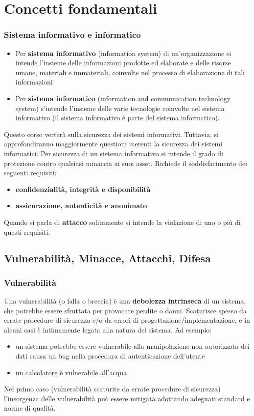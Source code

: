 \section{Concetti fondamentali}

\subsubsection{Sistema informativo e informatico}

\begin{itemize} 
  \item Per \textbf{sistema informativo} (information system) di un’organizzazione si intende l’insieme delle informazioni prodotte ed elaborate e delle risorse umane, materiali e immateriali, coinvolte nel processo di elaborazione di tali informazioni
  \item Per \textbf{sistema informatico} (information and communication technology system) s'intende l'insieme delle varie tecnologie coinvolte nel sistema informativo (il sistema informativo è parte del sistema informatico).
\end{itemize}
Questo corso verterà sulla sicurezza dei sistemi informativi. Tuttavia, si approfondiranno maggiormente questioni inerenti la sicurezza
dei sistemi informatici. Per sicurezza di un sistema informativo si intende il grado di protezione contro qualsiasi minaccia ai suoi asset.
Richiede il soddisfacimento dei seguenti requisiti:
\begin{itemize} 
  \item \textbf{confidenzialità, integrità e disponibilità}
  \item \textbf{assicurazione, autenticità e anonimato}
\end{itemize}
Quando si parla di \textbf{attacco} solitamente si intende la violazione di uno o più di questi requisiti.

\subsection{Vulnerabilità, Minacce, Attacchi, Difesa}
\subsubsection{Vulnerabilità}
Una vulnerabilità (o falla o breccia) è una \textbf{debolezza intrinseca} di un sistema, che potrebbe essere sfruttata per provocare perdite o danni. Scaturisce spesso da errate procedure di sicurezza e/o da errori di progettazione/implementazione, e  in alcuni casi è intimamente legata alla natura del sistema. Ad esempio:
\begin{itemize} 
  \item un sistema potrebbe essere vulnerabile alla manipolazione non autorizzata dei dati causa un bug nella procedura di autenticazione dell’utente
  \item un calcolatore è vulnerabile all'acqua
\end{itemize}
Nel primo caso (vulnerabilità scaturite da errate procedure di sicurezza) l'insorgenza delle vulnerabilità può essere mitigata adottando adeguati standard e norme di qualità.

